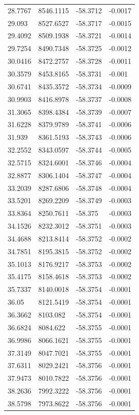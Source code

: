 \begin{table}[H]
\begin{tabular}{llll}
28.7767 & 8546.1115 & -58.3712 & -0.0017 \\
29.093 & 8527.6527 & -58.3717 & -0.0015 \\
29.4092 & 8509.1938 & -58.3721 & -0.0014 \\
29.7254 & 8490.7348 & -58.3725 & -0.0012 \\
30.0416 & 8472.2757 & -58.3728 & -0.0011 \\
30.3579 & 8453.8165 & -58.3731 & -0.001 \\
30.6741 & 8435.3572 & -58.3734 & -0.0009 \\
30.9903 & 8416.8978 & -58.3737 & -0.0008 \\
31.3065 & 8398.4384 & -58.3739 & -0.0007 \\
31.6228 & 8379.9789 & -58.3741 & -0.0006 \\
31.939 & 8361.5193 & -58.3743 & -0.0006 \\
32.2552 & 8343.0597 & -58.3744 & -0.0005 \\
32.5715 & 8324.6001 & -58.3746 & -0.0004 \\
32.8877 & 8306.1404 & -58.3747 & -0.0004 \\
33.2039 & 8287.6806 & -58.3748 & -0.0004 \\
33.5201 & 8269.2209 & -58.3749 & -0.0003 \\
33.8364 & 8250.7611 & -58.375 & -0.0003 \\
34.1526 & 8232.3012 & -58.3751 & -0.0003 \\
34.4688 & 8213.8414 & -58.3752 & -0.0002 \\
34.7851 & 8195.3815 & -58.3752 & -0.0002 \\
35.1013 & 8176.9217 & -58.3753 & -0.0002 \\
35.4175 & 8158.4618 & -58.3753 & -0.0002 \\
35.7337 & 8140.0018 & -58.3754 & -0.0001 \\
36.05 & 8121.5419 & -58.3754 & -0.0001 \\
36.3662 & 8103.082 & -58.3754 & -0.0001 \\
36.6824 & 8084.622 & -58.3755 & -0.0001 \\
36.9986 & 8066.1621 & -58.3755 & -0.0001 \\
37.3149 & 8047.7021 & -58.3755 & -0.0001 \\
37.6311 & 8029.2421 & -58.3756 & -0.0001 \\
37.9473 & 8010.7822 & -58.3756 & -0.0001 \\
38.2636 & 7992.3222 & -58.3756 & -0.0001 \\
38.5798 & 7973.8622 & -58.3756 & -0.0001 \\

\end{tabular}
\end{table}
